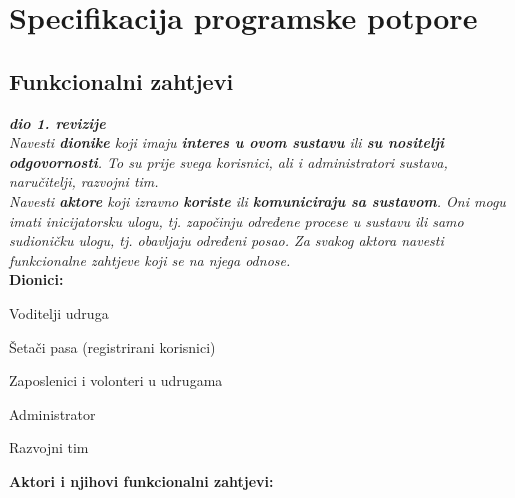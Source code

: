 \chapter{Specifikacija programske potpore}
	
\section{Funkcionalni zahtjevi}
		
		\textbf{\textit{dio 1. revizije}}\\
		
		\textit{Navesti \textbf{dionike} koji imaju \textbf{interes u ovom sustavu} ili  \textbf{su nositelji odgovornosti}. To su prije svega korisnici, ali i administratori sustava, naručitelji, razvojni tim.}\\
			
		\textit{Navesti \textbf{aktore} koji izravno \textbf{koriste} ili \textbf{komuniciraju sa sustavom}. Oni mogu imati inicijatorsku ulogu, tj. započinju određene procese u sustavu ili samo sudioničku ulogu, tj. obavljaju određeni posao. Za svakog aktora navesti funkcionalne zahtjeve koji se na njega odnose.}\\
		
		
		\noindent \textbf{Dionici:}
		
		\begin{packed_enum}
			
			\item Voditelji udruga
			\item Šetači pasa (registrirani korisnici)			
			\item Zaposlenici i volonteri u udrugama
			\item Administrator
			\item Razvojni tim
			
		\end{packed_enum}
		\vspace{5mm}
		
		\noindent \textbf{Aktori i njihovi funkcionalni zahtjevi:}
		

